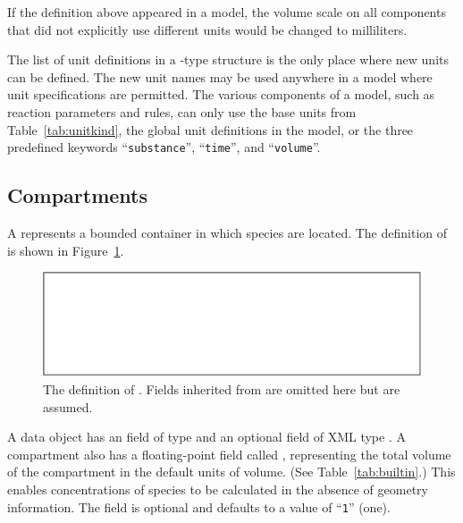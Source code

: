 \documentclass[10pt,twocolumntoc]{cekarticle}
\newcommand{\vref}[1]{\ref{#1}}
\begin{document}
If the definition above appeared in a model, the volume scale on all
components that did not explicitly use different units would be changed to
milliliters.

The list of unit definitions in a -type structure is the only
place where new units can be defined.  The new unit names may be used
anywhere in a model where unit specifications are permitted.  The various
components of a model, such as reaction parameters and rules, can only use
the base units from Table~\ref{tab:unitkind}, the global unit definitions
in the model, or the three predefined keywords ``\texttt{substance}'',
``\texttt{time}'', and ``\texttt{volume}''.

\subsection{Compartments}
\label{sec:compartments}

A  represents a bounded container in which
species are located.  The definition of  is
shown in Figure~\vref{fig:compartment}.

\begin{figure}[htb]
  \vspace*{8pt}
  \centering
  \includegraphics[scale = 0.68]{compartment}
  \caption{The definition of .
    Fields inherited from  are omitted here but are assumed.}
  \label{fig:compartment}
\end{figure}

A  data object has an  field of type
 and an optional  field of XML type
. A compartment also has a floating-point field
called , representing the total volume of the
compartment in the default units of volume. (See
Table~\vref{tab:builtin}.) This enables concentrations of species
to be calculated in the absence of geometry information. The
 field is optional and defaults to a value of
``\texttt{1}'' (one).
\end{document}
